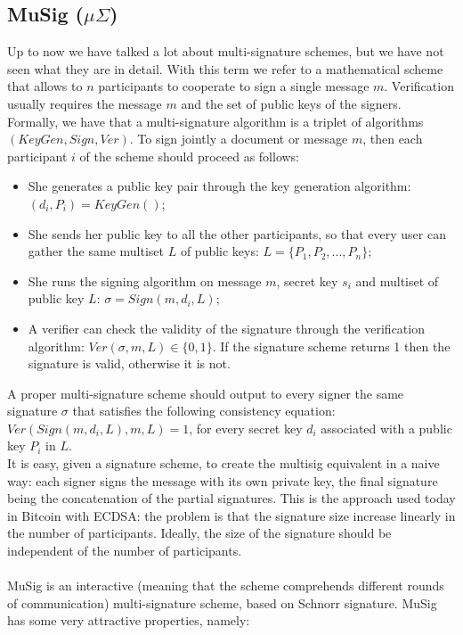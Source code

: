\subsection{MuSig ($\mu \Sigma$)}
Up to now we have talked a lot about multi-signature schemes, but we have not seen what they are in detail. With this term we refer to a mathematical scheme that allows to $n$ participants to cooperate to sign a single message $m$. Verification usually requires the message $m$ and the set of public keys of the signers.
\\
Formally, we have that a multi-signature algorithm is a triplet of algorithms $(KeyGen, Sign, Ver)$. To sign jointly a document or message $m$, then each participant $i$ of the scheme should proceed as follows:
\begin{itemize}
	\item She generates a public key pair through the key generation algorithm: $(d_i, P_i) = KeyGen()$;
	\item She sends her public key to all the other participants, so that every user can gather the same multiset $L$ of public keys: $L = \{P_1, P_2, ..., P_n\}$;
	\item She runs the signing algorithm on message $m$, secret key $s_i$ and multiset of public key $L$: $\sigma = Sign(m, d_i, L)$;
	\item A verifier can check the validity of the signature through the verification algorithm: $Ver(\sigma, m, L) \in \{0, 1\}$. If the signature scheme returns 1 then the signature is valid, otherwise it is not.
\end{itemize}
A proper multi-signature scheme should output to every signer the same signature $\sigma$ that satisfies the following consistency equation: $Ver(Sign(m, d_i, L), m, L) = 1$, for every secret key $d_i$ associated with a public key $P_i$ in $L$.
\\
It is easy, given a signature scheme, to create the multisig equivalent in a naive way: each signer signs the message with its own private key, the final signature being the concatenation of the partial signatures. This is the approach used today in Bitcoin with ECDSA: the problem is that the signature size increase linearly in the number of participants. Ideally, the size of the signature should be independent of the number of participants.
\\
\\
MuSig is an interactive (meaning that the scheme comprehends different rounds of communication) multi-signature scheme, based on Schnorr signature. MuSig has some very attractive properties, namely:
